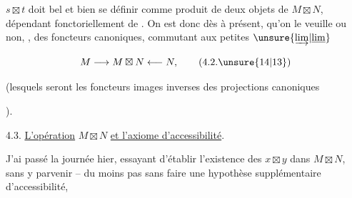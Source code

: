 
$s\boxtimes t$ doit bel et bien se définir comme produit de deux objets de $M\boxtimes N$, dépendant fonctoriellement de . On est donc  dès à présent, qu'on le veuille ou non, ,  des foncteurs canoniques, commutant aux petites $\unsure{\underrightarrow{\lim}|\underline{\lim}}$

\[
M\longrightarrow M\boxtimes N\longleftarrow N,
\tag*{(4.2.\unsure{14|13})}
\]


(lesquels seront les foncteurs images inverses des projections canoniques


).

4.3. \uline{L'opération} $M\boxtimes N$ \uline{et l'axiome d'accessibilité}.

J'ai passé la journée hier, essayant d'établir l'existence des $x\boxtimes y$ dans $M\boxtimes N$, sans y parvenir -- du moins pas sans faire  une hypothèse supplémentaire d'accessibilité,

